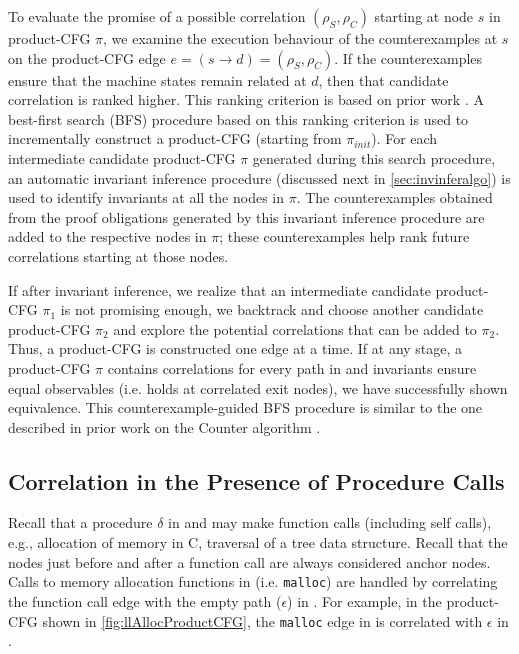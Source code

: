 To evaluate the promise of a possible correlation $(\rho_S,\rho_C)$ starting at node $s$
in product-CFG $\pi$, we examine the execution behaviour of the counterexamples at $s$ on
the product-CFG edge $e=(s\rightarrow d)=(\rho_S,\rho_C)$.
If the counterexamples ensure that the machine states remain related at $d$,
then that candidate correlation is ranked higher.
This ranking criterion is based on prior work \cite{oopsla20}.
A best-first search (BFS) procedure based on this ranking criterion is used to incrementally construct
a product-CFG (starting from $\pi_{init}$).
For each intermediate candidate product-CFG $\pi$ generated during this search procedure,
an automatic invariant inference procedure (discussed next in \cref{sec:invinferalgo}) is
used to identify invariants at all the nodes in $\pi$.
The counterexamples obtained from the proof obligations generated by this invariant inference
procedure are added to the respective nodes in $\pi$; these counterexamples help rank
future correlations starting at those nodes.

If after invariant inference, we realize that an intermediate candidate product-CFG $\pi_1$
is not promising enough, we backtrack and choose another candidate product-CFG $\pi_2$
and explore the potential correlations that can be added to $\pi_2$.
Thus, a product-CFG is constructed one edge at a time.
If at any stage, a product-CFG $\pi$ contains correlations for every path in \cprog{}
and invariants ensure equal observables (i.e. \post{} holds at correlated exit nodes),
we have successfully shown equivalence.
This counterexample-guided BFS procedure is similar to the one described in prior work on
the Counter algorithm \cite{oopsla20}.

\subsection{Correlation in the Presence of Procedure Calls}
\label{sec:correlfcalls}
Recall that a procedure $\delta$ in \sprog{} and \cprog{} may make function calls (including self calls),
e.g., allocation of memory in C, traversal of a tree data structure.
Recall that the nodes just before and after a function call are always considered anchor nodes.
Calls to memory allocation functions in \cprog{} (i.e. {\tt malloc}) are handled by correlating
the function call edge with the empty path ($\epsilon$) in \sprog{}.
For example, in the product-CFG shown in \cref{fig:llAllocProductCFG}, the {\tt malloc} edge  in \cprog{}
is correlated with $\epsilon$ in \sprog{}.

